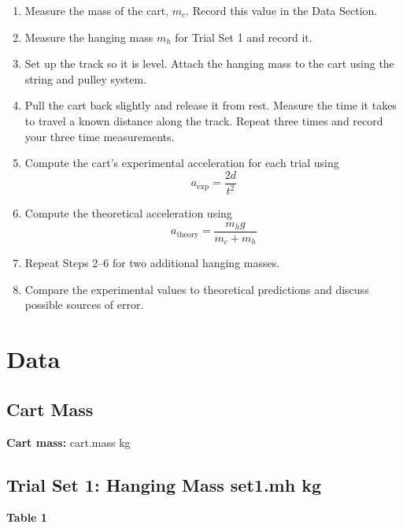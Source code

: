 \documentclass[12pt]{article}
\begin{document}
\begin{enumerate}[label=\arabic*.]
    \item Measure the mass of the cart, $m_c$. Record this value in the Data Section.

    \item Measure the hanging mass $m_h$ for Trial Set 1 and record it.

    \item Set up the track so it is level. Attach the hanging mass to the cart using the string and pulley system.

    \item Pull the cart back slightly and release it from rest. Measure the time it takes to travel a known distance along the track. Repeat three times and record your three time measurements.

    \item Compute the cart's experimental acceleration for each trial using
    \[
    a_{\text{exp}} = \frac{2d}{t^2}
    \]

    \item Compute the theoretical acceleration using
    \[
    a_{\text{theory}} = \frac{m_h g}{m_c + m_h}
    \]

    \item Repeat Steps 2–6 for two additional hanging masses.

    \item Compare the experimental values to theoretical predictions and discuss possible sources of error.
\end{enumerate}

\section*{Data}

\subsection*{Cart Mass}
\textbf{Cart mass:} {{ cart.mass }} kg


\subsection*{Trial Set 1: Hanging Mass {{ set1.mh }} kg}

\begin{center}
\textbf{Table 1}
\end{center}
\end{document}
